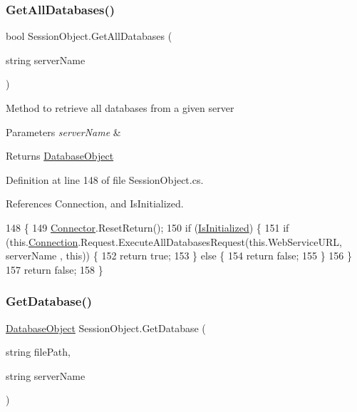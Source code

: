 \subsubsection{\texorpdfstring{Get\+All\+Databases()}{GetAllDatabases()}}
{\footnotesize\ttfamily bool Session\+Object.\+Get\+All\+Databases (\begin{DoxyParamCaption}\item[{string}]{server\+Name }\end{DoxyParamCaption})}



Method to retrieve all databases from a given server 


\begin{DoxyParams}{Parameters}
{\em server\+Name} & \\
\hline
\end{DoxyParams}
\begin{DoxyReturn}{Returns}
\mbox{\hyperlink{class_database_object}{Database\+Object}}
\end{DoxyReturn}


Definition at line 148 of file Session\+Object.\+cs.



References Connection, and Is\+Initialized.


\begin{DoxyCode}
148                                                    \{
149         \mbox{\hyperlink{class_connector}{Connector}}.ResetReturn();
150         \textcolor{keywordflow}{if} (\mbox{\hyperlink{class_session_object_ae0885b9054fc3ce287307ac16ff69990}{IsInitialized}}) \{
151             \textcolor{keywordflow}{if} (this.\mbox{\hyperlink{class_session_object_a014bdbf705a753540e19bfb53030c55c}{Connection}}.Request.ExecuteAllDatabasesRequest(\textcolor{keyword}{this}.WebServiceURL, serverName
      , \textcolor{keyword}{this})) \{
152                 \textcolor{keywordflow}{return} \textcolor{keyword}{true};
153             \} \textcolor{keywordflow}{else} \{
154                 \textcolor{keywordflow}{return} \textcolor{keyword}{false};
155             \}
156         \}
157         \textcolor{keywordflow}{return} \textcolor{keyword}{false};
158     \}
\end{DoxyCode}
\mbox{\label{class_session_object_aa4871ea2dac4215bef0274a2bd71ae72}} 
\subsubsection{\texorpdfstring{Get\+Database()}{GetDatabase()}}
{\footnotesize\ttfamily \mbox{\hyperlink{class_database_object}{Database\+Object}} Session\+Object.\+Get\+Database (\begin{DoxyParamCaption}\item[{string}]{file\+Path,  }\item[{string}]{server\+Name }\end{DoxyParamCaption})}



